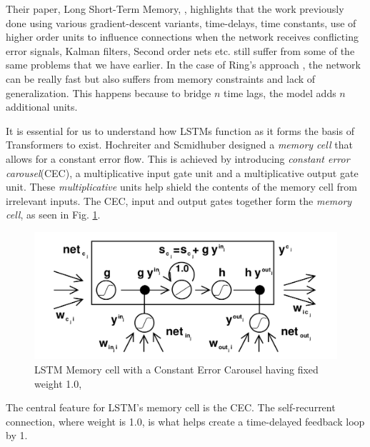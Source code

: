 \documentclass[a4paper,12pt]{report}
\begin{document}
            Their paper, Long Short-Term Memory, \citep{lstmoriginal}, highlights that the work previously done using various gradient-descent variants, time-delays, time constants, use of higher order units to influence connections when the network receives conflicting error signals, Kalman filters, Second order nets etc. still suffer from some of the same problems that we have earlier. In the case of Ring's approach \citep{lstmRing}, the network can be really fast but also suffers from memory constraints and lack of generalization. This happens because to bridge $ n $ time lags, the model adds $ n $ additional units.

            It is essential for us to understand how LSTMs function as it forms the basis of Transformers to exist. Hochreiter and Scmidhuber designed a \textit{memory cell} that  allows for a constant error flow. This is achieved by introducing \textit{constant error carousel}(CEC), a multiplicative input gate unit and a multiplicative output gate unit. These \textit{multiplicative} units help shield the contents of the memory cell from irrelevant inputs. The CEC, input and output gates together form the \textit{memory cell}, as seen in Fig. \ref{lstmCEC}.
           	\begin{figure}[h!]
      				\includegraphics[scale=0.35]{../images/lstm-memorycell.png}
      				\caption{LSTM Memory cell with a Constant Error Carousel having fixed weight 1.0, \citep{lstmoriginal}}\label{lstmCEC}
             \end{figure}
            The central feature for LSTM's memory cell is the CEC. The self-recurrent connection, where weight is 1.0, is what helps create a time-delayed feedback loop by 1.
\end{document}

